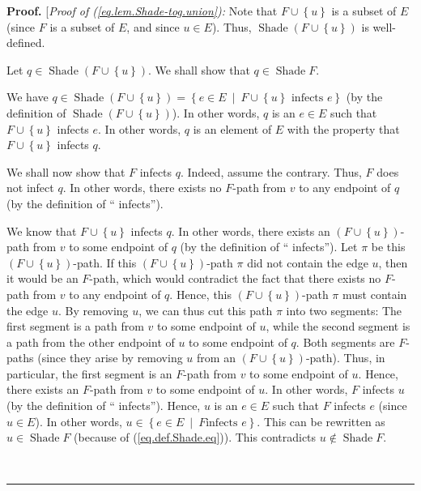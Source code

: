 \documentclass[numbers=enddot,12pt,final,onecolumn]{scrartcl}%
\theoremstyle{definition}
\newenvironment{proof}[1][Proof]{\noindent\textbf{#1.} }{\ \rule{0.5em}{0.5em}}
\newenvironment{verlong}{}{}
\begin{document}
\begin{proof}
\begin{verlong}
[\textit{Proof of (\ref{eq.lem.Shade-tog.union}):} Note that $F\cup\left\{
u\right\}  $ is a subset of $E$ (since $F$ is a subset of $E$, and since $u\in
E$). Thus, $\operatorname*{Shade}\left(  F\cup\left\{  u\right\}  \right)  $
is well-defined.

Let $q\in\operatorname*{Shade}\left(  F\cup\left\{  u\right\}  \right)  $. We
shall show that $q\in\operatorname*{Shade}F$.

We have $q\in\operatorname*{Shade}\left(  F\cup\left\{  u\right\}  \right)
=\left\{  e\in E\ \mid\ F\cup\left\{  u\right\}  \text{ infects }e\right\}  $
(by the definition of $\operatorname*{Shade}\left(  F\cup\left\{  u\right\}
\right)  $). In other words, $q$ is an $e\in E$ such that $F\cup\left\{
u\right\}  $ infects $e$. In other words, $q$ is an element of $E$ with the
property that $F\cup\left\{  u\right\}  $ infects $q$.

We shall now show that $F$ infects $q$. Indeed, assume the contrary. Thus, $F$
does not infect $q$. In other words, there exists no $F$-path from $v$ to any
endpoint of $q$ (by the definition of \textquotedblleft
infects\textquotedblright).

We know that $F\cup\left\{  u\right\}  $ infects $q$. In other words, there
exists an $\left(  F\cup\left\{  u\right\}  \right)  $-path from $v$ to some
endpoint of $q$ (by the definition of \textquotedblleft
infects\textquotedblright). Let $\pi$ be this $\left(  F\cup\left\{
u\right\}  \right)  $-path. If this $\left(  F\cup\left\{  u\right\}  \right)
$-path $\pi$ did not contain the edge $u$, then it would be an $F$-path, which
would contradict the fact that there exists no $F$-path from $v$ to any
endpoint of $q$. Hence, this $\left(  F\cup\left\{  u\right\}  \right)  $-path
$\pi$ must contain the edge $u$. By removing $u$, we can thus cut this path
$\pi$ into two segments: The first segment is a path from $v$ to some endpoint
of $u$, while the second segment is a path from the other endpoint of $u$ to
some endpoint of $q$. Both segments are $F$-paths (since they arise by
removing $u$ from an $\left(  F\cup\left\{  u\right\}  \right)  $-path). Thus,
in particular, the first segment is an $F$-path from $v$ to some endpoint of
$u$. Hence, there exists an $F$-path from $v$ to some endpoint of $u$. In
other words, $F$ infects $u$ (by the definition of \textquotedblleft
infects\textquotedblright). Hence, $u$ is an $e\in E$ such that $F$ infects
$e$ (since $u\in E$). In other words, $u\in\left\{  e\in E\ \mid\ F\text{
infects }e\right\}  $. This can be rewritten as $u\in\operatorname*{Shade}F$
(because of (\ref{eq.def.Shade.eq})). This contradicts $u\notin%
\operatorname*{Shade}F$.


\end{verlong}
\end{proof}
\end{document}
